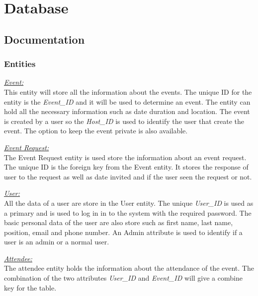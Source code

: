 \documentclass[a4paper]{article}
\begin{document}
\section{Database}
\subsection{Documentation}
\subsubsection{Entities}
\underline{\textit{Event:}} \\
This entity will store all the information about the events. The unique ID for the entity is the \textit{Event\_ID} and it will be used to determine an event. The entity can hold all the necessary information such as date duration and location. The event is created by a user so the \textit{Host\_ID} is used to identify the user that create the event. The option to keep the event private is also available. 

\underline{\textit{Event Request:}} \\
The Event Request entity is used store the information about an event request. The unique ID is the foreign key from the Event entity. It stores the response of user to the request as well as date invited and if the user seen the request or not. 

\underline{\textit{User:}} \\
All the data of a user are store in the User entity. The unique \textit{User\_ID} is used as a primary and is used to log in in to the system with the required password. The basic personal data of the user are also store such as first name, last name, position, email and phone number. An Admin attribute is used to identify if a user is an admin or a normal user. 

\underline{\textit{Attendee:}} \\
The attendee entity holds the information about the attendance of the event. The combination of the two attributes \textit{User\_ID} and \textit{Event\_ID} will give a combine key for the table. 
\end{document}
